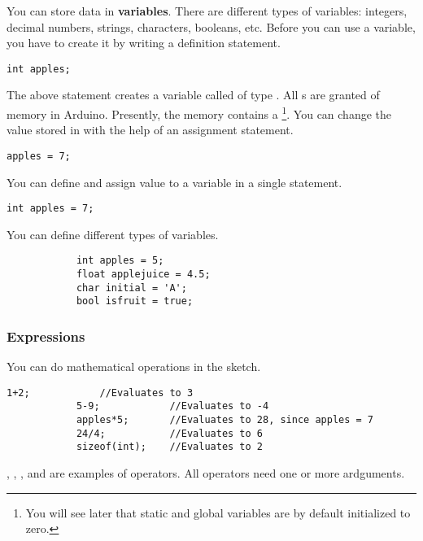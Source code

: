 \documentclass{article}
\begin{document}
			You can store data in \textbf{variables}. There are different types of variables: integers, decimal numbers, strings, characters, booleans, etc. Before you can use a variable, you have to create it by writing a definition statement.

			\begin{lstlisting}[caption={Definition}, label=definition]
			int apples;
			\end{lstlisting}

			The above statement creates a variable called  of type . All s are granted  of memory in Arduino. Presently, the memory contains a \footnote{You will see later that static and global variables are by default initialized to zero.}. You can change the value stored in  with the help of an assignment statement.

			\begin{lstlisting}[caption={Assignment}, label=assignment]
			apples = 7;
			\end{lstlisting}

			You can define and assign value to a variable in a single statement.

			\begin{lstlisting}[caption={Assignment}, label=assignment]
			int apples = 7;
			\end{lstlisting}

			You can define different types of variables.

			\begin{lstlisting}
			int apples = 5;
			float applejuice = 4.5;
			char initial = 'A';
			bool isfruit = true;
			\end{lstlisting}

		\subsubsection{Expressions}

			You can do mathematical operations in the sketch.

			\begin{lstlisting}[caption={Expressions}, label=expressions]
			1+2;			//Evaluates to 3
			5-9;			//Evaluates to -4
			apples*5;		//Evaluates to 28, since apples = 7
			24/4;			//Evaluates to 6
			sizeof(int);	//Evaluates to 2
			\end{lstlisting}

			\inlncd{+}, \inlncd{-}, \inlncd{*}, \inlncd{/} and  are examples of operators. All operators need one or more ardguments.
\end{document}
